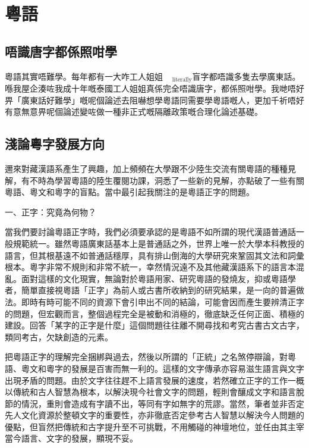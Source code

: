 \chapter{粵語}

\section{唔識唐字都係照咁學}

粵語其實唔難學。每年都有一大咋工人姐姐$_{\text{literally}}$盲字都唔識多隻去學廣東話。喺我屋企湊咗我成十年嘅泰國工人姐姐真係完全唔識唐字，都係照咁學。我哋唔好畀「廣東話好難學」嘅呢個論述去阻嚇想學粵語同需要學粵語嘅人，更加千祈唔好有意無意畀呢個論述變咗做一種非正式嘅隔離政策嘅合理化論述基礎。


\section{淺論粵字發展方向}

邇來對藏漢語系產生了興趣，加上頻頻在大學跟不少陸生交流有關粵語的種種見解，有不時為學習粵語的陸生覆閱功課，洞悉了一些新的見解，亦點破了一些有關粵語、粵文和粵字的盲點。當中最引起我關注的是粵語正字的問題。

一、正字：究竟為何物？

當我們要討論粵語正字時，我們必須要承認的是粵語不如所謂的現代漢語普通話一般規範統一。雖然粵語廣東話基本上是普通話之外，世界上唯一於大學本科教授的語言，但其根基遠不如普通話穩厚，具有排山倒海的大學研究來鞏固其文法和詞彙根本。粵字非常不規則和非常不統一，幸然情況遠不及其他藏漢語系下的語言本混亂。面對這樣的文化現實，無論對於粵語用家、研究粵語的發燒友，抑或粵語學者，簡單直接視粵語「正字」為前人或古書所收納到的研究結果，是一向的普遍做法。即時有時可能不同的資源下會引申出不同的結論，可能會因而產生要辨清正字的問題，但宏觀而言，整個過程完全是被動和消極的，徹底缺乏任何正面、積極的建設。回答「某字的正字是什麼」這個問題往往離不開尋找和考究古書古文古字，類同考古，欠缺創造的元素。

把粵語正字的理解完全捆綁與過去，然後以所謂的「正統」之名煞停辯論，對粵語、粵文和粵字的發展是百害而無一利的。這樣的文字傳承亦容易滋生語言與文字出現矛盾的問題。由於文字往往趕不上語言發展的速度，若然確立正字的工作一概以傳統和古人智慧為根本，以解決現今社會文字的問題，輕則會釀成文字和語言脫節的情況，重則會造成有字讀不出，等同有字如無字的荒謬。當然，筆者並非否定先人文化資源於整頓文字的重要性，亦非徹底否定參考古人智慧以解決今人問題的優點，但盲然把傳統和古字提升至不可挑戰，不用觸碰的神壇地位，並任由其主宰當今語言、文字的發展，顯現不妥。

